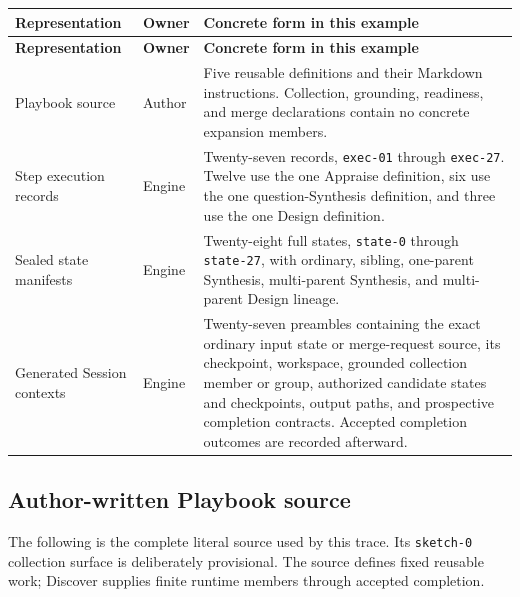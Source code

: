 \documentclass[11pt]{article}
\begin{document}
\begin{longtable}{@{}L{1.34in}L{0.82in}L{4.38in}@{}}
\toprule
\textbf{Representation} & \textbf{Owner} & \textbf{Concrete form in this example} \\
\midrule
\endfirsthead
\toprule
\textbf{Representation} & \textbf{Owner} & \textbf{Concrete form in this example} \\
\midrule
\endhead
Playbook source & Author & Five reusable definitions and their Markdown instructions. Collection, grounding, readiness, and merge declarations contain no concrete expansion members. \\
Step execution records & Engine & Twenty-seven records, \texttt{exec-01} through \texttt{exec-27}. Twelve use the one Appraise definition, six use the one question-Synthesis definition, and three use the one Design definition. \\
Sealed state manifests & Engine & Twenty-eight full states, \texttt{state-0} through \texttt{state-27}, with ordinary, sibling, one-parent Synthesis, multi-parent Synthesis, and multi-parent Design lineage. \\
Generated Session contexts & Engine & Twenty-seven preambles containing the exact ordinary input state or merge-request source, its checkpoint, workspace, grounded collection member or group, authorized candidate states and checkpoints, output paths, and prospective completion contracts. Accepted completion outcomes are recorded afterward. \\
\bottomrule
\end{longtable}

\subsection{Author-written Playbook source}

The following is the complete literal source used by this trace. Its
\texttt{sketch-0} collection surface is deliberately provisional. The source
defines fixed reusable work; Discover supplies finite runtime members through
accepted completion.


\end{document}
